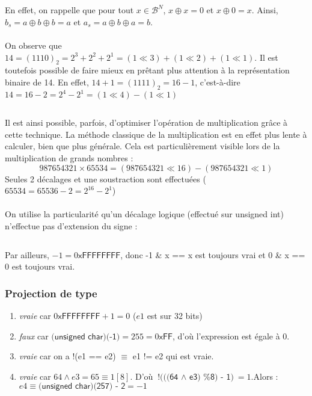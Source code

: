 \documentclass[../main.tex]{subfiles}
\begin{document}
\\ \\ 
\inputminted{c}{solutions/inter_no_side_effect_2.c}
En effet, on rappelle que pour tout ${x\in{\mathcal{B}^{N}}}$, $x\oplus{x} = 0$ et $x\oplus{0} = x$. Ainsi, $b_{s} = a\oplus{b}\oplus{b} = a$ et $a_{s} = a\oplus{b}\oplus{a} = b$.
\\ \\ 
 On observe que $14 = (1110)_{2} = 2^{3} + 2^{2} + 2^{1} = (1 \ll 3) + (1 \ll 2) + (1 \ll 1)$. Il est toutefois possible de faire mieux en prêtant plus attention à la représentation binaire de 14. En effet, $14 + 1 = (1111)_{2} = 16 - 1$, c'est-à-dire $14 = 16 - 2 = 2^{4} - 2^{1} = (1 \ll 4) - (1 \ll 1)$
\inputminted{c}{solutions/mult_decalage.c}
Il est ainsi possible, parfois, d'optimiser l'opération de multiplication grâce à cette technique. La méthode classique de la multiplication est en effet plus lente à calculer, bien que plus générale. Cela est particulièrement visible lors de la multiplication de grands nombres :
$$987654321\times{65534} = (987654321 \ll 16) - (987654321 \ll 1)$$
Seules 2 décalages et une soustraction sont effectuées ($65534 = 65536 - 2 = 2^{16} - 2^{1}$)
\\ \\ 
On utilise la particularité qu'un décalage logique (effectué sur \textsf{unsigned int}) n'effectue pas d'extension du signe :
\inputminted{c}{solutions/valeur_absolue.c}
Par ailleurs, $-1 = 0\textsf{xFFFFFFFF}$, donc \textsf{-1 \& x == x} est toujours vrai et \textsf{0 \& x == 0} est toujours vrai.
\subsubsection{Projection de type}
\begin{enumerate}
	\item \textit{vraie} car $0\textsf{xFFFFFFFF} + 1 = 0$ ($e1$ est sur 32 bits)
	\item \textit{faux} car $\textsf{(unsigned char)(-1)} = 255 = 0\textsf{xFF}$, d'où l'expression est égale à 0.
	\item \textit{vraie} car on a \textsf{!(e1 == e2)} $\equiv$ \textsf{e1 != e2} qui est vraie.
	\item \textit{vraie} car $64\wedge{e3} = 65 \equiv 1[8]$. D'où $\textsf{!(((64 $\wedge$ e3) \% 8) - 1)} = 1$.\newline Alors : $e4 \equiv{\textsf{(unsigned char)(257) - 2}} = -1$
\end{enumerate}
\end{document}
